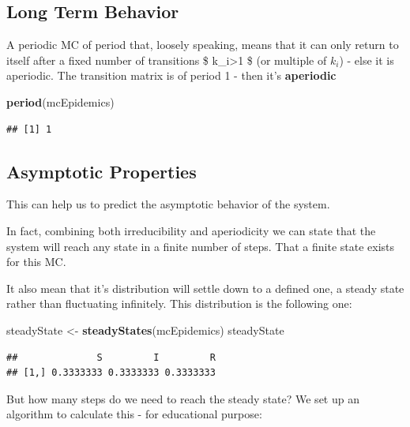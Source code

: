 \documentclass[
]{article}
\newenvironment{Shaded}{\begin{snugshade}}{\end{snugshade}}
\newcommand{\KeywordTok}[1]{\textcolor[rgb]{0.13,0.29,0.53}{\textbf{#1}}}
\newcommand{\NormalTok}[1]{#1}
\newcommand{\StringTok}[1]{\textcolor[rgb]{0.31,0.60,0.02}{#1}}
\begin{document}
\hypertarget{long-term-behavior}{%
\subsection{Long Term Behavior}\label{long-term-behavior}}

A periodic MC of period that, loosely speaking, means that it can only
return to itself after a fixed number of transitions \$
k\_i\textgreater1 \$ (or multiple of \(k_i\)) - else it is aperiodic.
The transition matrix is of period 1 - then it's \textbf{aperiodic}

\begin{Shaded}
\begin{Highlighting}[]
\KeywordTok{period}\NormalTok{(mcEpidemics)}
\end{Highlighting}
\end{Shaded}

\begin{verbatim}
## [1] 1
\end{verbatim}

\hypertarget{asymptotic-properties}{%
\subsection{Asymptotic Properties}\label{asymptotic-properties}}

This can help us to predict the asymptotic behavior of the system.

In fact, combining both irreducibility and aperiodicity we can state
that the system will reach any state in a finite number of steps. That a
finite state exists for this MC.

It also mean that it's distribution will settle down to a defined one, a
steady state rather than fluctuating infinitely. This distribution is
the following one:

\begin{Shaded}
\begin{Highlighting}[]
\NormalTok{steadyState <-}\StringTok{ }\KeywordTok{steadyStates}\NormalTok{(mcEpidemics)}
\NormalTok{steadyState}
\end{Highlighting}
\end{Shaded}

\begin{verbatim}
##              S         I         R
## [1,] 0.3333333 0.3333333 0.3333333
\end{verbatim}

But how many steps do we need to reach the steady state? We set up an
algorithm to calculate this - for educational purpose:
\end{document}
